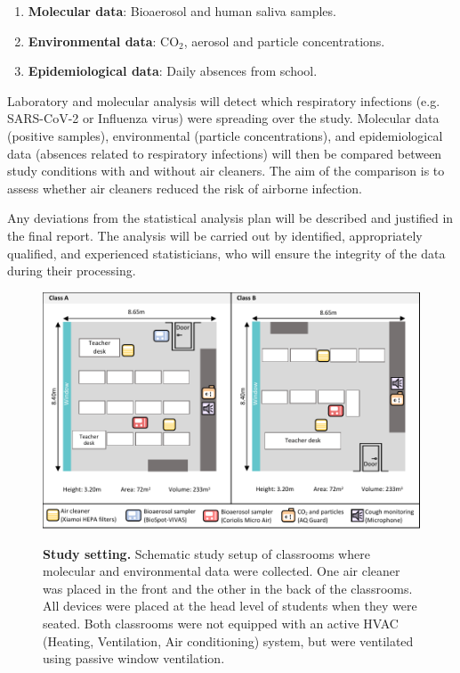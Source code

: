 \documentclass{article}
\begin{document}
\begin{enumerate}
    \item \textbf{Molecular data}: Bioaerosol and human saliva samples.
    \item \textbf{Environmental data}: CO$_2$, aerosol and particle concentrations.
    \item \textbf{Epidemiological data}: Daily absences from school.
\end{enumerate}
 
Laboratory and molecular analysis will detect which respiratory infections (e.g. SARS-CoV-2 or Influenza virus) were spreading over the study. Molecular data (positive samples), environmental (particle concentrations), and epidemiological data (absences related to respiratory infections) will then be compared between study conditions with and without air cleaners. The aim of the comparison is to assess whether air cleaners reduced the risk of airborne infection. \smallskip

Any deviations from the statistical analysis plan will be described and justified in the final report. The analysis will be carried out by identified, appropriately qualified, and experienced statisticians, who will ensure the integrity of the data during their processing.

\begin{figure}[!htpb]
    \centering
    \caption{\textbf{Study setting.} Schematic study setup of classrooms where molecular and environmental data were collected. One air cleaner was placed in the front and the other in the back of the classrooms. All devices were placed at the head level of students when they were seated. Both classrooms were not equipped with an active HVAC (Heating, Ventilation, Air conditioning) system, but were ventilated using passive window ventilation.}
    \includegraphics{../study_setting.pdf}
    \label{fig:study_setting}
\end{figure}
\end{document}
